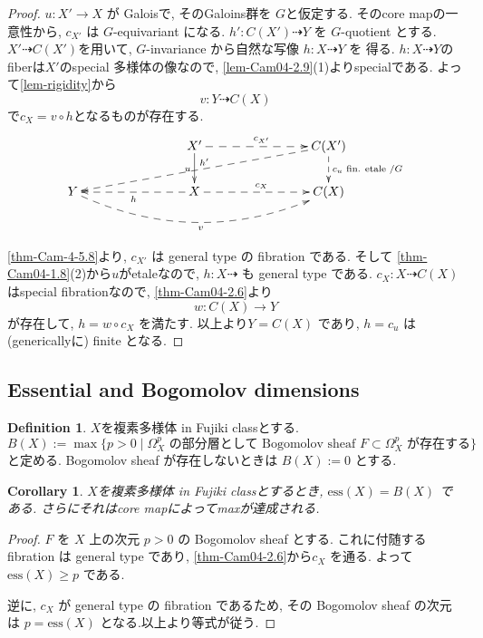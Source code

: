 \documentclass[dvipdfmx,a4paper,11pt]{article} %
\newtheorem{cor}[thm]{Corollary}
\theoremstyle{definition}
\newtheorem{defn}[thm]{Definition}
\theoremstyle{remark}
\numberwithin{equation}{section}
\begin{document}
\begin{proof}
\( u :X' \to X  \) が Galoisで, そのGaloins群を \( G \)と仮定する. 
そのcore mapの一意性から, \( c_{X'} \) は \( G \)-equivariant になる.
\( h' : C(X') \dashrightarrow Y \) を \( G \)-quotient とする.
$X' \dashrightarrow C(X')$を用いて, 
\( G \)-invariance から自然な写像
\(
h: X \dashrightarrow Y
\)
を 得る. 
$h : X \dashrightarrow  Y$のfiberは$X'$のspecial 多様体の像なので, \ref{lem-Cam04-2.9}(1)よりspecialである. 
よって\ref{lem-rigidity}から
\[
v : Y \dashrightarrow  C(X)
\]
で$c_X = v \circ h$となるものが存在する. 
\[
\xymatrix@C=80pt@R=20pt{
&X' \ar@{->}[d]_{u} \ar@{-->}[r]^{c_{X'}}& C(X')  \ar@{-->}[d]^{c_u \text{ fin. etale $/G$}}  \ar@{-->}[lld]_{ \hspace{10pt} h'} \\
Y \ar@/_2pc/@{-->}[rr]_{ v }&X\ar@{-->}[r]^{c_{X}}\ar@{-->}[l]^{h}& C(X)  
}
\]


\ref{thm-Cam-4-5.8}より, \( c_{X'} \) は general type の fibration である.
そして \ref{thm-Cam04-1.8}(2)から$u$がetaleなので,  \( h : X \dashrightarrow \) も general type である.
$c_{X} : X \dashrightarrow C(X)$はspecial fibrationなので, 
\ref{thm-Cam04-2.6}より
\[
w : C(X) \to Y
\]
が存在して, \( h = w \circ c_X \) を満たす. 
以上より\( Y = C(X) \) であり, \( h = c_u \) は(genericallyに) finite となる.
\end{proof}

\subsection{Essential and Bogomolov dimensions \cite[5.6]{Cam04}}

\begin{defn}\cite[Definition 5.13]{Cam04}
$X$を複素多様体 in Fujiki classとする. 
\[
B(X) := \max \{ p>0 \mid \Omega_X^p \text{ の部分層として Bogomolov sheaf } F \subset \Omega_X^p \text{ が存在する} \}
\]
と定める.
Bogomolov sheaf が存在しないときは \( B(X) := 0 \) とする.
\end{defn}

\begin{cor}\cite[Corollary 5.14, 5.15]{Cam04}
$X$を複素多様体 in Fujiki classとするとき, \( \mathrm{ess}(X) = B(X) \) である. 
さらにそれはcore mapによってmaxが達成される. 
\end{cor}

\begin{proof}
\( F \) を \( X \) 上の次元 \( p>0 \) の Bogomolov sheaf とする.
これに付随する fibration は general type であり, \ref{thm-Cam04-2.6}から\( c_X \) を通る.
よって \( \mathrm{ess}(X) \ge p \) である.

逆に, \( c_X \) が general type の fibration であるため, その Bogomolov sheaf の次元は \( p = \mathrm{ess}(X) \) となる.以上より等式が従う.
\end{proof}
\end{document}
